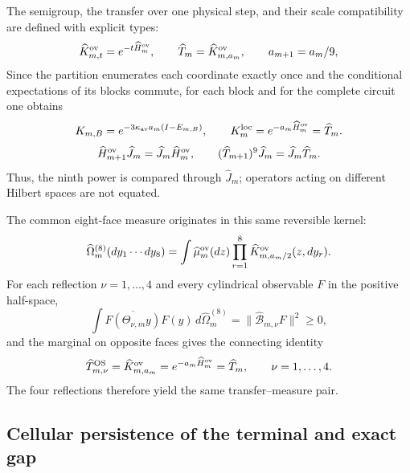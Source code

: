The semigroup, the transfer over one physical step, and their scale
compatibility are defined with explicit types:
\begin{equation}\label{eq:realizaciones-ym-semigrupo}
 \widehat K_{m,t}^{\rm ov}=e^{-t\widehat H_m^{\rm ov}},
 \qquad
 \widehat T_m=\widehat K_{m,a_m}^{\rm ov},
 \qquad a_{m+1}=a_m/9,
\end{equation}
Since the partition enumerates each coordinate exactly once and the conditional
expectations of its blocks commute, for each block and for the complete
circuit one obtains
\begin{equation}\label{eq:realizaciones-ym-circuito-semigrupo}
 K_{m,B}=e^{-3\kappa_{\rm av}a_m(I-E_{m,B})},
 \qquad
 K_m^{\rm loc}=e^{-a_m\widehat H_m^{\rm ov}}=\widehat T_m.
\end{equation}
\begin{equation}\label{eq:realizaciones-ym-semigrupo-entrelazado}
 \widehat H_{m+1}^{\rm ov}\widehat J_m
 =\widehat J_m\widehat H_m^{\rm ov},
 \qquad
 (\widehat T_{m+1})^9\widehat J_m
 =\widehat J_m\widehat T_m.
\end{equation}
Thus, the ninth power is compared through \(\widehat J_m\); operators
acting on different Hilbert spaces are not equated.

The common eight-face measure originates in this same reversible kernel:
\begin{equation}\label{eq:realizaciones-ym-medida-ocho}
 \widehat\Omega_m^{(8)}(dy_1\cdots dy_8)
 =\int\widehat\mu_m^{\rm ov}(dz)
   \prod_{r=1}^{8}
   \widehat K_{m,a_m/2}^{\rm ov}(z,dy_r).
\end{equation}
For each reflection \(\nu=1,\ldots,4\) and every cylindrical observable \(F\)
in the positive half-space,
\begin{equation}\label{eq:realizaciones-ym-os}
 \int\overline{F(\Theta_{\nu,m}y)}F(y)\,
 d\widehat\Omega_m^{(8)}
 =\|\widehat{\mathcal B}_{m,\nu}F\|^2\geq0,
\end{equation}
and the marginal on opposite faces gives the connecting identity
\begin{equation}\label{eq:realizaciones-ym-os-transferencia}
 \widehat T_{m,\nu}^{\rm OS}
 =\widehat K_{m,a_m}^{\rm ov}
 =e^{-a_m\widehat H_m^{\rm ov}}
 =\widehat T_m,
 \qquad \nu=1,\ldots,4.
\end{equation}
The four reflections therefore yield the same
transfer--measure pair.

\subsection*{Cellular persistence of the terminal and exact gap}

